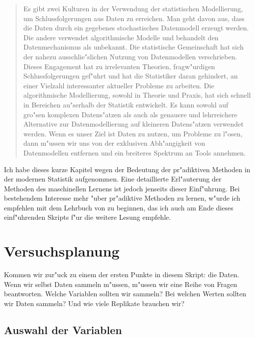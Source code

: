 \documentclass[a4paper,twoside]{tufte-book}\usepackage[]{graphicx}\usepackage[]{color}
\begin{document}
\begin{quote}
Es gibt zwei Kulturen in der Verwendung der statistischen Modellierung, um Schlussfolgerungen aus Daten zu erreichen. Man geht davon aus, dass die Daten durch ein gegebenes stochastisches Datenmodell erzeugt werden. Die andere verwendet algorithmische Modelle und behandelt den Datenmechanismus als unbekannt. Die statistische Gemeinschaft hat sich der nahezu ausschlie"slichen Nutzung von Datenmodellen verschrieben. Dieses Engagement hat zu irrelevanten Theorien, fragw"urdigen Schlussfolgerungen gef"uhrt und hat die Statistiker daran gehindert, an einer Vielzahl interessanter aktueller Probleme zu arbeiten. Die algorithmische Modellierung, sowohl in Theorie und Praxis, hat sich schnell in Bereichen au"serhalb der Statistik entwickelt. Es kann sowohl auf gro"sen komplexen Datens"atzen als auch als genauere und lehrreichere Alternative zur Datenmodellierung auf kleineren Datens"atzen verwendet werden. Wenn es unser Ziel ist Daten zu nutzen, um Probleme zu l"osen, dann m"ussen wir uns von der exklusiven Abh"angigkeit von Datenmodellen entfernen und ein breiteres Spektrum an Tools annehmen.
\end{quote}


Ich habe dieses kurze Kapitel wegen der Bedeutung der pr"adiktiven Methoden in der modernen Statistik aufgenommen. Eine detaillierte Erl"auterung der Methoden des maschinellen Lernens ist jedoch jenseits dieser Einf"uhrung. Bei bestehendem Interesse mehr "uber pr"adiktive Methoden zu lernen, w"urde ich empfehlen mit dem Lehrbuch von \citet{James-IntroductiontoStatistical-2013} zu beginnen, das ich auch am Ende dieses einf"uhrenden Skripts f"ur die weitere Lesung empfehle.

\chapter{Versuchsplanung}\label{cha: design of experiments}

Kommen wir zur"uck zu einem der ersten Punkte in diesem Skript: die Daten. Wenn wir selbst Daten sammeln m"ussen, m"ussen wir eine Reihe von Fragen beantworten. Welche Variablen sollten wir sammeln? Bei welchen Werten sollten wir Daten sammeln? Und wie viele Replikate brauchen wir?


\section{Auswahl der Variablen}
\end{document}
